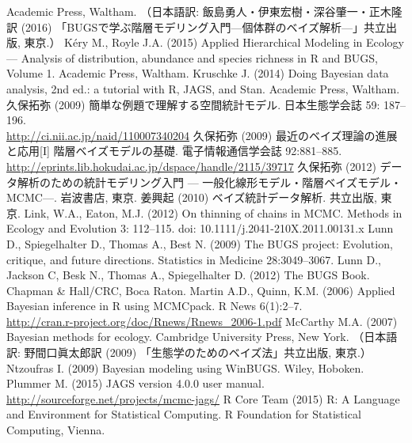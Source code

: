 \documentclass[11pt,uplatex]{jsarticle}
\begin{document}
\begin{thebibliography}{99}
  Academic Press, Waltham.
    （日本語訳: 飯島勇人・伊東宏樹・深谷肇一・正木隆訳 (2016) 「BUGSで学ぶ階層モデリング入門---個体群のベイズ解析---」共立出版, 東京.）
 K\'ery M., Royle J.A. (2015) Applied Hierarchical Modeling in Ecology --- Analysis of distribution, abundance and species richness in R and BUGS, Volume 1. Academic Press, Waltham.
 Kruschke J. (2014) Doing Bayesian data analysis, 2nd ed.:
  a tutorial with R, JAGS, and Stan. Academic Press, Waltham.
 久保拓弥 (2009) 簡単な例題で理解する空間統計モデル. 
  日本生態学会誌 59: 187--196. \\
  \url{http://ci.nii.ac.jp/naid/110007340204}
 久保拓弥 (2009) 最近のベイズ理論の進展と応用[I]
  階層ベイズモデルの基礎. 電子情報通信学会誌 92:881--885.\\
  \url{http://eprints.lib.hokudai.ac.jp/dspace/handle/2115/39717}
 久保拓弥 (2012) データ解析のための統計モデリング入門 ---
   一般化線形モデル・階層ベイズモデル・MCMC---. 岩波書店, 東京.
 姜興起 (2010) ベイズ統計データ解析. 共立出版, 東京.
 Link, W.A., Eaton, M.J. (2012) On thinning of chains in MCMC.
Methods in Ecology and Evolution 3: 112--115. doi: 10.1111/j.2041-210X.2011.00131.x
 Lunn D., Spiegelhalter D., Thomas A., Best N. (2009)
  {The BUGS project: Evolution, critique, and future directions}.
  {Statistics in Medicine} {28}:3049--3067.
 Lunn D., Jackson C, Besk N., Thomas A., Spiegelhalter D.
  (2012) The {BUGS} Book. Chapman \& Hall/CRC, Boca Raton.
 Martin A.D., Quinn, K.M. (2006) Applied Bayesian inference in R
using MCMCpack. R News 6(1):2--7. \\
    \url{http://cran.r-project.org/doc/Rnews/Rnews_2006-1.pdf}
 McCarthy M.A. (2007) Bayesian methods for ecology.
  Cambridge University Press, New York.
  （日本語訳: 野間口眞太郎訳 (2009) 「生態学のためのベイズ法」共立出版, 東京.）
 Ntzoufras I. (2009) Bayesian modeling using WinBUGS.
  Wiley, Hoboken.
 Plummer M. (2015) JAGS version 4.0.0 user manual.\\
  \url{http://sourceforge.net/projects/mcmc-jags/}
 R Core Team (2015)
   R: A Language and Environment for Statistical Computing.
   R Foundation for Statistical Computing, Vienna.\\

\end{thebibliography}
\end{document}
